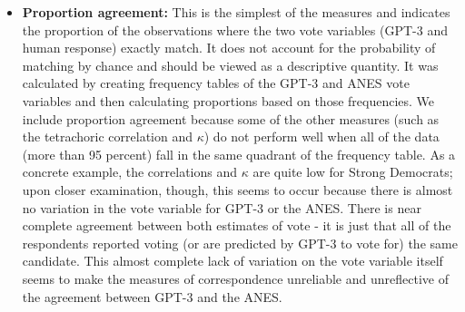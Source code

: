 \documentclass[11pt]{article}
\begin{document}
\begin{itemize}
  \item \textbf{Proportion agreement:} This is the simplest of the measures and indicates the proportion of the observations where the two vote variables (GPT-3 and human response) exactly match. It does not account for the probability of matching by chance and should be viewed as a descriptive quantity. It was calculated by creating frequency tables of the GPT-3 and ANES vote variables and then calculating proportions based on those frequencies. We include proportion agreement because some of the other measures (such as the tetrachoric correlation and $\kappa$) do not perform well when all of the data (more than 95 percent) fall in the same quadrant of the frequency table. As a concrete example, the correlations and $\kappa$ are quite low for Strong Democrats; upon closer examination, though, this seems to occur because there is almost no variation in the vote variable for GPT-3 or the ANES. There is near complete agreement between both estimates of vote - it is just that all of the respondents reported voting (or are predicted by GPT-3 to vote for) the same candidate. This almost complete lack of variation on the vote variable itself seems to make the measures of correspondence unreliable and unreflective of the agreement between GPT-3 and the ANES.
\end{itemize}
\end{document}
